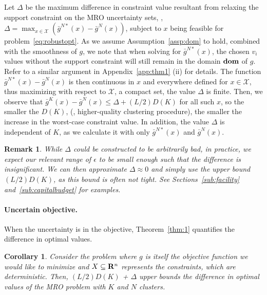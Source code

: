 \documentclass[12pt]{article}
\theoremstyle{thmstyleone}%
\newtheorem{corollary}[theorem]{Corollary}%
\theoremstyle{thmstyletwo}%
\newtheorem{remark}{Remark}%
\theoremstyle{thmstylethree}%
\newcommand{\reviewChanges}{}
\begin{document}
\reviewChanges{Let $\Delta$ be the maximum difference in constraint value resultant from relaxing the support constraint on the \gls{MRO} uncertainty sets, \ie, ${\Delta = \max_{x\in \mathcal{X}}\left(\bar{g}^{N*}(x) - \bar{g}^{N}(x)\right)}$, subject to $x$ being feasible for problem~\eqref{eq:robustopt}. 
As we assume Assumption~\ref{assp:dom} to hold, combined with the smoothness of $g$, we note that when solving for $\bar{g}^{N*}(x)$, the chosen $v_i$ values without the support constraint will still remain in the domain $\mathop{\bf dom}$ of $g$. 
Refer to a similar argument in Appendix~\ref{app:thm1} (ii) for details. 
The function $\bar{g}^{N*}(x) - \bar{g}^{N}(x)$ is then continuous in $x$ and everywhere defined for $x \in \mathcal{X}$, thus maximizing with respect to $\mathcal{X}$, a compact set, the value $\Delta$ is finite. }
Then, we observe that $ \bar{g}^K(x)  - \bar{g}^N(x)\leq \Delta +(L/2) D(K)$ for all such $x$, so the smaller the $D(K)$, (\ie, higher-quality clustering procedure), the smaller the increase in the worst-case constraint value. \reviewChanges{In addition, the value $\Delta$ is independent of $K$, as we calculate it with only $\bar{g}^{N*}(x)$ and $\bar{g}^{N}(x)$.}

\begin{remark} \label{rem:support}
While $\Delta$ could be constructed to be arbitrarily bad, in practice, we expect our relevant range of $\epsilon$ to be small enough such that the difference is insignificant.
We can then approximate $\Delta \approx 0$ and simply use the upper bound $(L/2)D(K)$, as this bound is often not tight. See Sections~\ref{sub:facility} and~\ref{sub:capitalbudget} for examples.
\end{remark}

\paragraph{Uncertain objective.}%
\label{par:uncertain_objective_}
When the uncertainty is in the objective, Theorem~\ref{thm:1} quantifies the difference in optimal values.
\begin{corollary}
	\label{cor:obj_unc}
Consider the problem where $g$ is itself the objective function we would like to minimize and $X \subseteq {\mathbf R}^n$ represents the constraints, which are deterministic.
Then, $(L/2)D(K)$ + $\Delta$ upper bounds the difference in optimal values of the \gls{MRO} problem with $K$ and $N$ clusters.
\end{corollary}
\end{document}
